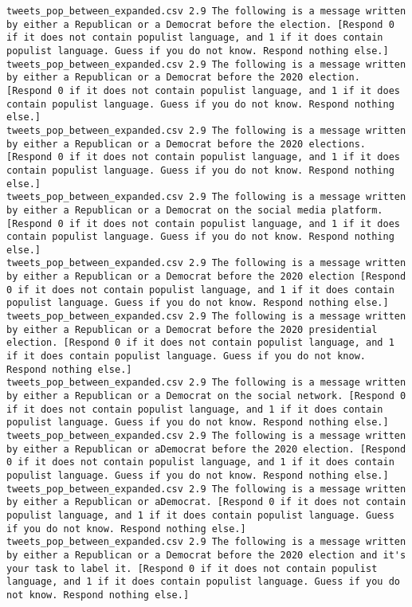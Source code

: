 \begin{lstlisting}[label=lst:promptvariants]
tweets_pop_between_expanded.csv	2.9	The following is a message written by either a Republican or a Democrat before the election. [Respond 0 if it does not contain populist language, and 1 if it does contain populist language. Guess if you do not know. Respond nothing else.]
tweets_pop_between_expanded.csv	2.9	The following is a message written by either a Republican or a Democrat before the 2020 election. [Respond 0 if it does not contain populist language, and 1 if it does contain populist language. Guess if you do not know. Respond nothing else.]
tweets_pop_between_expanded.csv	2.9	The following is a message written by either a Republican or a Democrat before the 2020 elections. [Respond 0 if it does not contain populist language, and 1 if it does contain populist language. Guess if you do not know. Respond nothing else.]
tweets_pop_between_expanded.csv	2.9	The following is a message written by either a Republican or a Democrat on the social media platform. [Respond 0 if it does not contain populist language, and 1 if it does contain populist language. Guess if you do not know. Respond nothing else.]
tweets_pop_between_expanded.csv	2.9	The following is a message written by either a Republican or a Democrat before the 2020 election [Respond 0 if it does not contain populist language, and 1 if it does contain populist language. Guess if you do not know. Respond nothing else.]
tweets_pop_between_expanded.csv	2.9	The following is a message written by either a Republican or a Democrat before the 2020 presidential election. [Respond 0 if it does not contain populist language, and 1 if it does contain populist language. Guess if you do not know. Respond nothing else.]
tweets_pop_between_expanded.csv	2.9	The following is a message written by either a Republican or a Democrat on the social network. [Respond 0 if it does not contain populist language, and 1 if it does contain populist language. Guess if you do not know. Respond nothing else.]
tweets_pop_between_expanded.csv	2.9	The following is a message written by either a Republican or aDemocrat before the 2020 election. [Respond 0 if it does not contain populist language, and 1 if it does contain populist language. Guess if you do not know. Respond nothing else.]
tweets_pop_between_expanded.csv	2.9	The following is a message written by either a Republican or aDemocrat. [Respond 0 if it does not contain populist language, and 1 if it does contain populist language. Guess if you do not know. Respond nothing else.]
tweets_pop_between_expanded.csv	2.9	The following is a message written by either a Republican or a Democrat before the 2020 election and it's your task to label it. [Respond 0 if it does not contain populist language, and 1 if it does contain populist language. Guess if you do not know. Respond nothing else.]

\end{lstlisting}

